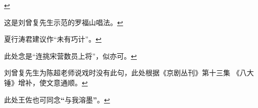   \protect\hyperlink{fnref538}{↩}
\item
  \leavevmode\hypertarget{fn539}{}%
  这是刘曾复先生示范的罗福山唱法。\protect\hyperlink{fnref539}{↩}
\item
  \leavevmode\hypertarget{fn540}{}%
  夏行涛君建议作``未有巧计''。\protect\hyperlink{fnref540}{↩}
\item
  \leavevmode\hypertarget{fn541}{}%
  此处念是``连挑宋营数员上将''，似亦可。\protect\hyperlink{fnref541}{↩}
\item
  \leavevmode\hypertarget{fn542}{}%
  刘曾复先生为陈超老师说戏时没有此句，此处根据《京剧丛刊》第十三集
  《八大锤》增补，使文意通顺。\protect\hyperlink{fnref542}{↩}
\item
  \leavevmode\hypertarget{fn543}{}%
  此处王佐也可同念\textbf{``}与我溶墨\textbf{''}。\protect\hyperlink{fnref543}{↩}
